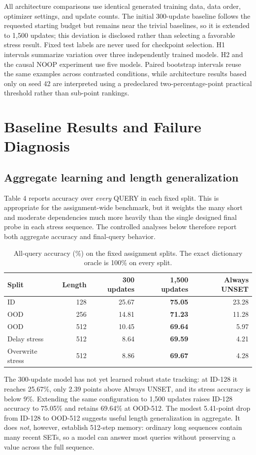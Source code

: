 \documentclass[10pt,a4paper]{article}
\begin{document}
All architecture comparisons use identical generated training data, data order, optimizer settings, and update counts. The initial 300-update baseline follows the requested starting budget but remains near the trivial baselines, so it is extended to 1,500 updates; this deviation is disclosed rather than selecting a favorable stress result. Fixed test labels are never used for checkpoint selection. H1 intervals summarize variation over three independently trained models. H2 and the causal NOOP experiment use five models. Paired bootstrap intervals reuse the same examples across contrasted conditions, while architecture results based only on seed 42 are interpreted using a predeclared two-percentage-point practical threshold rather than sub-point rankings.

\section{Baseline Results and Failure Diagnosis}
\subsection{Aggregate learning and length generalization}
Table 4 reports accuracy over \emph{every} QUERY in each fixed split. This is appropriate for the assignment-wide benchmark, but it weights the many short and moderate dependencies much more heavily than the single designed final probe in each stress sequence. The controlled analyses below therefore report both aggregate accuracy and final-query behavior.
\begin{table}[!htbp]
\centering\small
\caption{All-query accuracy (\%) on the fixed assignment splits. The exact dictionary oracle is 100\% on every split.}
\begin{tabular}{lrrrr}
\toprule
Split & Length & 300 updates & 1,500 updates & Always UNSET\\
\midrule
ID & 128 & 25.67 & \textbf{75.05} & 23.28\\
OOD & 256 & 14.81 & \textbf{71.23} & 11.28\\
OOD & 512 & 10.45 & \textbf{69.64} & 5.97\\
Delay stress & 512 & 8.64 & \textbf{69.59} & 4.21\\
Overwrite stress & 512 & 8.86 & \textbf{69.67} & 4.28\\
\bottomrule
\end{tabular}
\end{table}

The 300-update model has not yet learned robust state tracking: at ID-128 it reaches 25.67\%, only 2.39 points above Always UNSET, and its stress accuracy is below 9\%. Extending the same configuration to 1,500 updates raises ID-128 accuracy to 75.05\% and retains 69.64\% at OOD-512. The modest 5.41-point drop from ID-128 to OOD-512 suggests useful length generalization in aggregate. It does \emph{not}, however, establish 512-step memory: ordinary long sequences contain many recent SETs, so a model can answer most queries without preserving a value across the full sequence.
\end{document}
